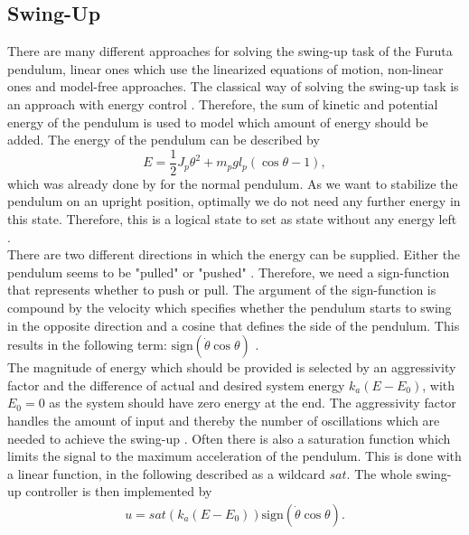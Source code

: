 \subsection{Swing-Up}
There are many different approaches for solving the swing-up task of the Furuta 
pendulum, linear ones which use the linearized equations of motion, non-linear 
ones and model-free approaches. The classical way of solving the swing-up task 
is 
an approach with energy control \citep{seman2013swinging}. Therefore, the sum 
of 
kinetic and potential energy of the pendulum is used to model which amount of 
energy should be added. The energy of the pendulum can be described by 
\[E = \frac{1}{2}J_p\theta^2+m_pgl_p(\cos \theta -1),\] which was already done 
by \cite{aastrom2000swinging} for the normal pendulum.
As we want to stabilize the pendulum on an upright position, optimally we do 
not need any further energy in this state. Therefore, this is a logical state 
to set as state without any energy left \citep{seman2013swinging}.\\
There are two different directions in which the 
energy can be supplied. Either the pendulum seems to be "pulled" or "pushed" 
\cite{seman2013swinging}. Therefore, we need a sign-function that represents 
whether to push or pull. The argument of the sign-function is compound by the 
velocity which specifies whether the pendulum starts to swing in the opposite 
direction and a cosine that defines the side of the pendulum. This results in 
the following term: $\text{sign}(\dot{\theta}\cos\theta)$ 
\citep{awtar2002inverted}. \\
The magnitude of energy which should be provided is 
selected by an aggressivity factor and the difference of actual and desired 
system energy $k_a(E-E_0)$, with $E_0=0$ as the system should have zero energy 
at the end. The aggressivity factor handles the amount of input 
and thereby the number of oscillations which are needed to achieve the 
swing-up \cite{awtar2002inverted}. Often there is also a saturation function 
which 
limits the signal to the maximum acceleration of the pendulum. This is done 
with a linear function, in the following described as a wildcard $sat$. The 
whole 
swing-up controller is then implemented by 
\begin{align*}
u = sat(k_a(E-E_0))\text{sign}(\dot{\theta}\cos\theta).
\end{align*}
